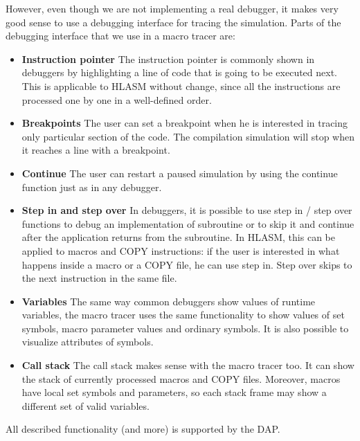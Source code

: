 However, even though we are not implementing a real debugger, it makes very good sense to use a debugging interface for tracing the simulation. Parts of the debugging interface that we use in a macro tracer are:
\begin{itemize}
	\item \textbf{Instruction pointer} The instruction pointer is commonly shown in debuggers by highlighting a line of code that is going to be executed next. This is applicable to HLASM without change, since all the instructions are processed one by one in a well-defined order.
	\item \textbf{Breakpoints} The user can set a breakpoint when he is interested in tracing only particular section of the code. The compilation simulation will stop when it reaches a line with a breakpoint.
	\item \textbf{Continue} The user can restart a paused simulation by using the continue function just as in any debugger.
	\item \textbf{Step in and step over} In debuggers, it is possible to use step in / step over functions to debug an implementation of subroutine or to skip it and continue after the application returns from the subroutine. In HLASM, this can be applied to macros and COPY instructions: if the user is interested in what happens inside a macro or a COPY file, he can use step in. Step over skips to the next instruction in the same file.
	\item \textbf{Variables} The same way common debuggers show values of runtime variables, the macro tracer uses the same functionality to show values of set symbols, macro parameter values and ordinary symbols. It is also possible to visualize attributes of symbols.
	\item \textbf{Call stack} The call stack makes sense with the macro tracer too. It can show the stack of currently processed macros and COPY files. Moreover, macros have local set symbols and parameters, so each stack frame may show a different set of valid variables.
\end{itemize}
All described functionality (and more) is supported by the DAP. 
  
